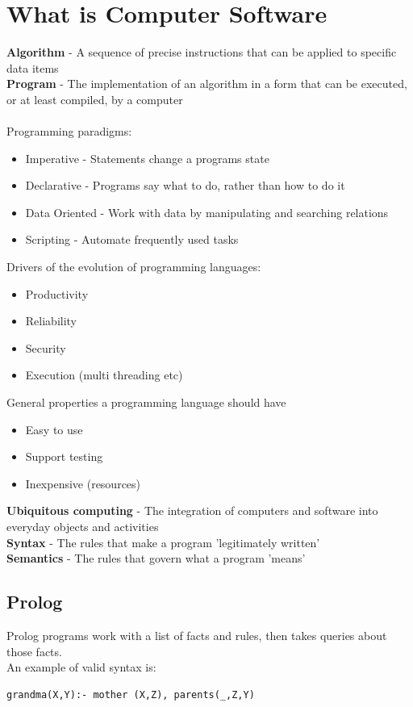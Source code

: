 \documentclass{article}[18pt]
\begin{document}
\section{What is Computer Software}
\textbf{Algorithm} - A sequence of precise instructions that can be applied to specific data items\\
\textbf{Program} - The implementation of an algorithm in a form that can be executed, or at least compiled, by a computer\\
\\
Programming paradigms:
\begin{itemize}
	\item Imperative - Statements change a programs state
	\item Declarative - Programs say what to do, rather than how to do it
	\item Data Oriented - Work with data by manipulating and searching relations
	\item Scripting - Automate frequently used tasks
\end{itemize}
Drivers of the evolution of programming languages:
\begin{itemize}
	\item Productivity 
	\item Reliability 
	\item Security
	\item Execution (multi threading etc)
\end{itemize}
General properties a programming language should have
\begin{itemize}
	\item Easy to use
	\item Support testing
	\item Inexpensive (resources)
\end{itemize}
\textbf{Ubiquitous computing} - The integration of computers and software into everyday objects and activities\\
\textbf{Syntax} - The rules that make a program 'legitimately written'\\
\textbf{Semantics} - The rules that govern what a program 'means'
\subsection{Prolog}
Prolog programs work with a list of facts and rules, then takes queries about those facts.\\
An example of valid syntax is:
\begin{lstlisting}
grandma(X,Y):- mother (X,Z), parents(_,Z,Y)
\end{lstlisting}
\end{document}
